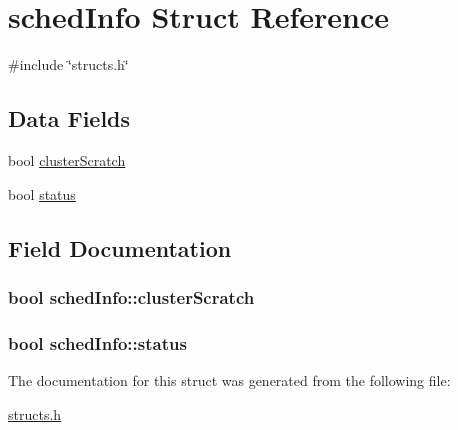 \hypertarget{structschedInfo}{\section{sched\-Info Struct Reference}
\label{structschedInfo}
}


{\ttfamily \#include \char`\"{}structs.\-h\char`\"{}}

\subsection*{Data Fields}
\begin{DoxyCompactItemize}
\item 
bool \hyperlink{structschedInfo_a2baf2f0b93992d3a3302a0107ce68f40}{cluster\-Scratch}
\item 
bool \hyperlink{structschedInfo_a030529daa6752db7ef2302d10c9d3d03}{status}
\end{DoxyCompactItemize}


\subsection{Field Documentation}
\hypertarget{structschedInfo_a2baf2f0b93992d3a3302a0107ce68f40}{
\subsubsection[{cluster\-Scratch}]{\setlength{\rightskip}{0pt plus 5cm}bool sched\-Info\-::cluster\-Scratch}}\label{structschedInfo_a2baf2f0b93992d3a3302a0107ce68f40}
\hypertarget{structschedInfo_a030529daa6752db7ef2302d10c9d3d03}{
\subsubsection[{status}]{\setlength{\rightskip}{0pt plus 5cm}bool sched\-Info\-::status}}\label{structschedInfo_a030529daa6752db7ef2302d10c9d3d03}


The documentation for this struct was generated from the following file\-:\begin{DoxyCompactItemize}
\item 
\hyperlink{structs_8h}{structs.\-h}\end{DoxyCompactItemize}
